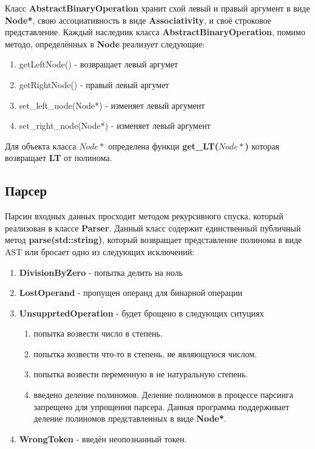 \documentclass{article}
\begin{document}
Класс \textbf{AbstractBinaryOperation} хранит схой левый и правый аргумент в виде \textbf{Node*}, 
свою ассоциативность в виде \textbf{Associativity}, и своё строковое представление. 
Каждый наследник класса \textbf{AbstractBinaryOperation}, помимо методо, определённых в \textbf{Node}
реализует следующие:
\begin{enumerate}
    \item getLeftNode() - возвращает левый аргумет
    \item getRightNode() - правый левый аргумет
    \item set\_left\_node(Node*) - изменяет левый аргумент
    \item set\_right\_node(Node*) - изменяет левый аргумент
\end{enumerate}

Для объекта класса $Node*$ определена функци \textbf{get\_LT($Node*$)} которая возвращает \textbf{LT} от полинома.


\subsection{Парсер}
Парсин входных данных просходит методом рекурсивного спуска, который реализован в классе \textbf{Parser}.
Данный класс содержит единственный публичный метод \textbf{parse(std::string)}, который возвращает представление 
полинома в виде AST или бросает одно из следующих исключений:
\begin{enumerate}
    \item \textbf{DivisionByZero} - попытка делить на ноль
    \item \textbf{LostOperand} - пропущен операнд для бинарной операции
    \item \textbf{UnsupprtedOperation} - будет брощено в следующих ситуциях
            \begin{enumerate}
                \item попытка возвести число в степень.     
                \item попытка возвести что-то в степень, не являющуюся числом.
                \item попытка возвести переменную в не натуральную степень.
                \item введено деление полиномов. Деление полиномов в процессе парсинга запрещено для упрощения парсера.
                Данная программа поддерживает деление полиномов представленных в виде \textbf{Node*}.  
            \end{enumerate}
    \item \textbf{WrongToken} - введён неопознанный токен.        

\end{enumerate}
\newpage
\end{document}
